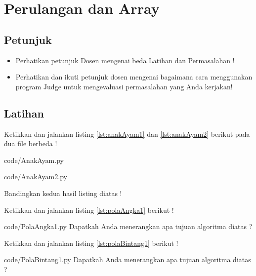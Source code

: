 \chapter{Perulangan dan Array}

\section{Petunjuk}
\begin{itemize}
	\item Perhatikan petunjuk Dosen mengenai beda Latihan dan Permasalahan !
	\
	\item Perhatikan dan ikuti petunjuk dosen mengenai bagaimana cara menggunakan program Judge untuk mengevaluasi permasalahan yang Anda kerjakan!
\end{itemize}

\section{Latihan}


\begin{latihan}
Ketikkan dan jalankan listing \ref{lst:anakAyam1} dan \ref{lst:anakAyam2} berikut pada dua file berbeda ! 
									
 							  {code/AnakAyam.py}



									
 							  {code/AnakAyam2.py}
								
Bandingkan kedua hasil listing diatas ! 
\end{latihan}

\begin{latihan}
Ketikkan dan jalankan listing \ref{lst:polaAngka1}  berikut  ! 
									
 							  {code/PolaAngka1.py}
Dapatkah Anda menerangkan apa tujuan algoritma diatas ?  
\end{latihan}


\begin{latihan}
Ketikkan dan jalankan listing \ref{lst:polaBintang1}  berikut  ! 
									
 							  {code/PolaBintang1.py}
Dapatkah Anda menerangkan apa tujuan algoritma diatas ?  

\end{latihan}

